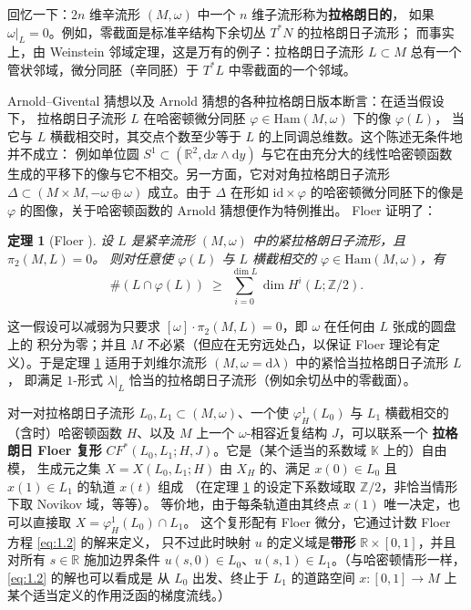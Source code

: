 \documentclass[UTF8,a4paper,11pt,fontset=windows]{ctexart}
\theoremstyle{cnthm}
\newtheorem{thm}{定理}[section]
\numberwithin{equation}{section}
\newcommand{\R}{\mathbb{R}}
\newcommand{\Z}{\mathbb{Z}}
\newcommand{\KK}{\mathbb{K}}          %
\newcommand{\CF}{CF}                  %
\begin{document}
回忆一下：$2n$ 维辛流形 $(M,\omega)$ 中一个 $n$ 维子流形称为\textbf{拉格朗日的}，
如果 $\omega|_{L}=0$。例如，零截面是标准辛结构下余切丛 $T^{*}N$ 的拉格朗日子流形；
而事实上，由 Weinstein 邻域定理，这是万有的例子：拉格朗日子流形 $L\subset M$ 总有一个
管状邻域，微分同胚（辛同胚）于 $T^{*}L$ 中零截面的一个邻域。

Arnold--Givental 猜想以及 Arnold 猜想的各种拉格朗日版本断言：在适当假设下，
拉格朗日子流形 $L$ 在哈密顿微分同胚 $\varphi\in\mathrm{Ham}(M,\omega)$ 下的像 $\varphi(L)$，
当它与 $L$ 横截相交时，其交点个数至少等于 $L$ 的上同调总维数。这个陈述无条件地并不成立：
例如单位圆 $S^{1}\subset(\R^{2},\mathrm{d}x\wedge\mathrm{d}y)$ 与它在由充分大的线性哈密顿函数
生成的平移下的像与它不相交。另一方面，它对对角拉格朗日子流形
$\Delta\subset(M\times M,-\omega\oplus\omega)$ 成立。由于 $\Delta$ 在形如 $\mathrm{id}\times\varphi$
的哈密顿微分同胚下的像是 $\varphi$ 的图像，关于哈密顿函数的 Arnold 猜想便作为特例推出。
Floer 证明了：

\begin{thm}[Floer \cite{r39}]\label{thm:1.3}
设 $L$ 是紧辛流形 $(M,\omega)$ 中的紧拉格朗日子流形，且 $\pi_2(M,L)=0$。
则对任意使 $\varphi(L)$ 与 $L$ 横截相交的 $\varphi\in\mathrm{Ham}(M,\omega)$，有
\[
\#(L\cap\varphi(L))\;\ge\;\sum_{i=0}^{\dim L}\dim H^{i}(L;\Z/2).
\]
\end{thm}

这一假设可以减弱为只要求 $[\omega]\cdot\pi_2(M,L)=0$，即 $\omega$ 在任何由 $L$ 张成的圆盘上的
积分为零；并且 $M$ 不必紧（但应在无穷远处凸，以保证 Floer 理论有定义）。于是定理
\ref{thm:1.3} 适用于刘维尔流形 $(M,\omega=\mathrm{d}\lambda)$ 中的紧恰当拉格朗日子流形 $L$，
即满足 $1$-形式 $\lambda|_{L}$ 恰当的拉格朗日子流形（例如余切丛中的零截面）。

对一对拉格朗日子流形 $L_0,L_1\subset(M,\omega)$、一个使 $\varphi^1_H(L_0)$ 与 $L_1$ 横截相交的
（含时）哈密顿函数 $H$、以及 $M$ 上一个 $\omega$-相容近复结构 $J$，可以联系一个
\textbf{拉格朗日 Floer 复形} $\CF^{*}(L_0,L_1;H,J)$。它是（某个适当的系数域 $\KK$ 上的）自由模，
生成元之集 $X=X(L_0,L_1;H)$ 由 $X_H$ 的、满足 $x(0)\in L_0$ 且 $x(1)\in L_1$ 的轨道 $x(t)$ 组成
（在定理 \ref{thm:1.3} 的设定下系数域取 $\Z/2$，非恰当情形下取 Novikov 域，等等）。
等价地，由于每条轨道由其终点 $x(1)$ 唯一决定，也可以直接取 $X=\varphi^1_H(L_0)\cap L_1$。
这个复形配有 Floer 微分，它通过计数 Floer 方程 \eqref{eq:1.2} 的解来定义，
只不过此时映射 $u$ 的定义域是\textbf{带形} $\R\times[0,1]$，并且对所有 $s\in\R$ 施加边界条件
$u(s,0)\in L_0$、$u(s,1)\in L_1$。（与哈密顿情形一样，\eqref{eq:1.2} 的解也可以看成是
从 $L_0$ 出发、终止于 $L_1$ 的道路空间 $x:[0,1]\to M$ 上某个适当定义的作用泛函的梯度流线。）
\end{document}
